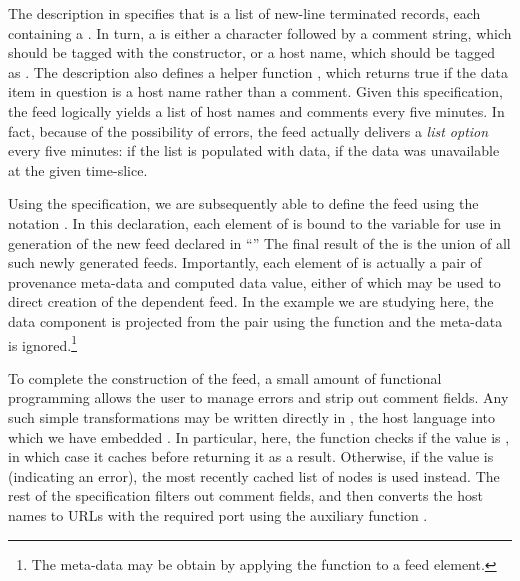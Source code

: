 The \padsml{} description in  
specifies that  is a list of
new-line terminated records, each containing a .  In
turn, a  is either a  character followed by a
comment string, which should be tagged with the 
constructor, or a host name, which should be tagged as
. The description also defines a helper function ,
which returns true if the data item in question is a host name
rather than a comment.  Given this specification, the  feed
logically yields a list of host names and comments every five minutes.
In fact, because of the possibility of errors, the feed actually
delivers a {\em list option} every five minutes:  if the list is
populated with data,  if the data was unavailable at the
given time-slice.

Using the  specification, we are subsequently able to define 
the  feed using the notation 
     .
In this declaration, each element of  is bound to the variable
 for use in generation of the new feed declared in ``''
The final result of the  is the union of all such newly
generated feeds.
Importantly, each element of  is actually a pair of
provenance meta-data and computed data value, either of which may be used
to direct creation of the dependent feed.  In the example we are
studying here, the data component is projected from the pair
using the  function and the meta-data is ignored.\footnote{The
meta-data may be obtain by applying the function  to a feed
element.}  

To complete the construction of the  feed,
a small amount of functional programming allows the user 
to manage errors and strip out comment fields.  Any such simple
transformations may be written directly in \ocaml{}, the host language 
into which we have embedded \padsd{}.  In particular, here,
the  function checks if
the  value is , in which case it caches 
before returning it as a result.  Otherwise, if the  value
is  (indicating an error), the most recently cached list of nodes 
is used instead.  The
rest of the  specification filters out comment fields, and then
converts the host names to URLs with the required port using the
auxiliary function .


